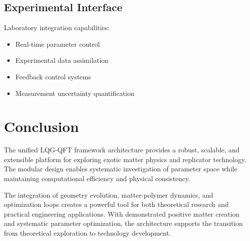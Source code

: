 \documentclass[11pt]{article}
\begin{document}
\subsection{Experimental Interface}

Laboratory integration capabilities:
\begin{itemize}
\item Real-time parameter control
\item Experimental data assimilation
\item Feedback control systems
\item Measurement uncertainty quantification
\end{itemize}

\section{Conclusion}

The unified LQG-QFT framework architecture provides a robust, scalable, and extensible platform for exploring exotic matter physics and replicator technology. The modular design enables systematic investigation of parameter space while maintaining computational efficiency and physical consistency.

The integration of geometry evolution, matter-polymer dynamics, and optimization loops creates a powerful tool for both theoretical research and practical engineering applications. With demonstrated positive matter creation and systematic parameter optimization, the architecture supports the transition from theoretical exploration to technology development.
\end{document}
